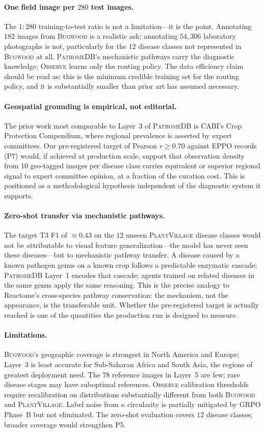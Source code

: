 \documentclass[11pt,twocolumn]{article}
\newcommand{\observe}{\textsc{Observe}\xspace}
\newcommand{\pathomedb}{\textsc{PathomeDB}\xspace}
\newcommand{\bugwood}{\textsc{Bugwood}\xspace}
\newcommand{\pv}{\textsc{PlantVillage}\xspace}
\begin{document}
\paragraph{One field image per $280$ test images.}
The $1{:}280$ training-to-test ratio is not
a limitation---it is the point. Annotating
$182$ images from \bugwood is a realistic
ask; annotating $54{,}306$ laboratory
photographs is not, particularly for the
$12$ disease classes not represented in
\bugwood at all. \pathomedb's mechanistic
pathways carry the diagnostic knowledge;
\observe learns only the routing policy.
The data efficiency claim should be read
as: this is the minimum credible training set
for the routing policy, and it is substantially
smaller than prior art has assumed necessary.

\paragraph{Geospatial grounding is empirical, not editorial.}
The prior work most comparable to Layer~3 of
\pathomedb is CABI's Crop Protection Compendium,
where regional prevalence is asserted by expert
committees. Our pre-registered target of
Pearson $r{\geq}0.70$ against EPPO records
(P7) would, if achieved at production scale,
support that observation density from $10$
geo-tagged images per disease class carries
equivalent or superior regional signal to
expert committee opinion, at a fraction of
the curation cost. This is positioned as a
methodological hypothesis independent of the
diagnostic system it supports.

\paragraph{Zero-shot transfer via mechanistic pathways.}
The target T3 F1 of ${\approx}0.43$ on the $12$
unseen \pv disease classes would not be
attributable to visual feature generalization---the
model has never seen these diseases---but to
mechanistic pathway transfer. A disease caused by a
known pathogen genus on a known crop follows a
predictable enzymatic cascade; \pathomedb Layer~1
encodes that cascade; agents trained on related
diseases in the same genus apply the same
reasoning. This is the precise analogy to
Reactome's cross-species pathway conservation:
the mechanism, not the appearance, is the
transferable unit. Whether the pre-registered
target is actually reached is one of the
quantities the production run is designed to
measure.

\paragraph{Limitations.}
\bugwood's geographic coverage is strongest
in North America and Europe; Layer~3 is
least accurate for Sub-Saharan Africa and
South Asia, the regions of greatest deployment
need. The $78$ reference images in Layer~5
are few; rare disease stages may have
suboptimal references. \observe calibration
thresholds require recalibration on
distributions substantially different from
both \bugwood and \pv. Label noise from
$\kappa$ circularity is partially mitigated
by GRPO Phase~B but not eliminated.
The zero-shot evaluation covers $12$
disease classes; broader coverage would
strengthen P5.
\end{document}
